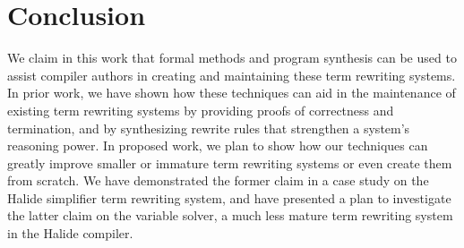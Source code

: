 \chapter{Conclusion}
\label{chapter:conclusion}

We claim in this work that formal methods and program synthesis can be used to assist compiler authors in creating and maintaining these term rewriting systems. In prior work, we have shown how these techniques can aid in the maintenance of existing term rewriting systems by providing proofs of correctness and termination, and by synthesizing rewrite rules that strengthen a system's reasoning power. In proposed work, we plan to show how our techniques can greatly improve smaller or immature term rewriting systems or even create them from scratch. We have demonstrated the former claim in a case study on the Halide simplifier term rewriting system, and have presented a plan to investigate the latter claim on the variable solver, a much less mature term rewriting system in the Halide compiler.